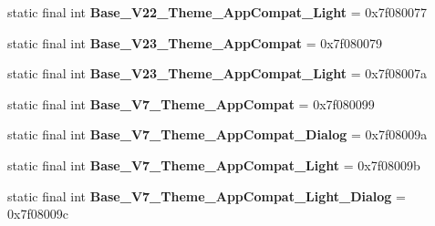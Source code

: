 \begin{DoxyCompactItemize}
\item 
\hypertarget{classandroid_1_1support_1_1v7_1_1appcompat_1_1_r_1_1style_a26869f46923cbd24e2e79aaef1c05467}{}static final int {\bfseries Base\+\_\+\+V22\+\_\+\+Theme\+\_\+\+App\+Compat\+\_\+\+Light} = 0x7f080077\label{classandroid_1_1support_1_1v7_1_1appcompat_1_1_r_1_1style_a26869f46923cbd24e2e79aaef1c05467}

\item 
\hypertarget{classandroid_1_1support_1_1v7_1_1appcompat_1_1_r_1_1style_aeb390174348a40b9d377b252a7727d39}{}static final int {\bfseries Base\+\_\+\+V23\+\_\+\+Theme\+\_\+\+App\+Compat} = 0x7f080079\label{classandroid_1_1support_1_1v7_1_1appcompat_1_1_r_1_1style_aeb390174348a40b9d377b252a7727d39}

\item 
\hypertarget{classandroid_1_1support_1_1v7_1_1appcompat_1_1_r_1_1style_a7d90475931148b5ca67b10d2fdc370b5}{}static final int {\bfseries Base\+\_\+\+V23\+\_\+\+Theme\+\_\+\+App\+Compat\+\_\+\+Light} = 0x7f08007a\label{classandroid_1_1support_1_1v7_1_1appcompat_1_1_r_1_1style_a7d90475931148b5ca67b10d2fdc370b5}

\item 
\hypertarget{classandroid_1_1support_1_1v7_1_1appcompat_1_1_r_1_1style_af7bbf205eddb9f8c00176de5b1e9f819}{}static final int {\bfseries Base\+\_\+\+V7\+\_\+\+Theme\+\_\+\+App\+Compat} = 0x7f080099\label{classandroid_1_1support_1_1v7_1_1appcompat_1_1_r_1_1style_af7bbf205eddb9f8c00176de5b1e9f819}

\item 
\hypertarget{classandroid_1_1support_1_1v7_1_1appcompat_1_1_r_1_1style_ac7263441f275d66e68fdf170d1031abe}{}static final int {\bfseries Base\+\_\+\+V7\+\_\+\+Theme\+\_\+\+App\+Compat\+\_\+\+Dialog} = 0x7f08009a\label{classandroid_1_1support_1_1v7_1_1appcompat_1_1_r_1_1style_ac7263441f275d66e68fdf170d1031abe}

\item 
\hypertarget{classandroid_1_1support_1_1v7_1_1appcompat_1_1_r_1_1style_a447ddfdca58adb0c8720b9efcd480886}{}static final int {\bfseries Base\+\_\+\+V7\+\_\+\+Theme\+\_\+\+App\+Compat\+\_\+\+Light} = 0x7f08009b\label{classandroid_1_1support_1_1v7_1_1appcompat_1_1_r_1_1style_a447ddfdca58adb0c8720b9efcd480886}

\item 
\hypertarget{classandroid_1_1support_1_1v7_1_1appcompat_1_1_r_1_1style_a08bfd257261eced92485a6a577209bcf}{}static final int {\bfseries Base\+\_\+\+V7\+\_\+\+Theme\+\_\+\+App\+Compat\+\_\+\+Light\+\_\+\+Dialog} = 0x7f08009c\label{classandroid_1_1support_1_1v7_1_1appcompat_1_1_r_1_1style_a08bfd257261eced92485a6a577209bcf}


\end{DoxyCompactItemize}
